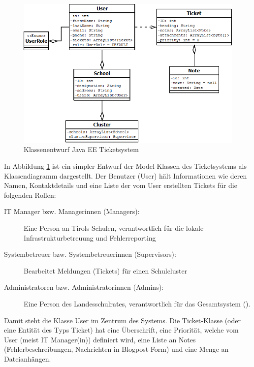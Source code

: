 \begin{figure}[h]
	\centering
	\includegraphics[scale=0.6]{figures/klassenentwurf_java_ticketsys_export.png}
	\caption{Klassenentwurf Java EE Ticketsystem}
	\label{Abb_Klassendesign_TicketSys}
\end{figure}

In Abbildung \ref{Abb_Klassendesign_TicketSys} ist ein simpler Entwurf der Model-Klassen des Ticketsystems als Klassendiagramm dargestellt. Der Benutzer (User) hält Informationen wie deren Namen, Kontaktdetails und eine Liste der vom User erstellten Tickets für die folgenden Rollen:

\begin{description}
	\item[IT Manager bzw. Managerinnen (Managers):] Eine Person an Tirols Schulen, verantwortlich für die lokale Infrastrukturbetreuung und Fehlerreporting
	\item[Systembetreuer bzw. Systembetreuerinnen (Supervisors):] Bearbeitet Meldungen (Tickets) für einen Schulcluster
	\item[Administratoren bzw. Administratorinnen (Admins):] Eine Person des Landesschulrates, verantwortlich für das Gesamtsystem (\getHammerl).
\end{description}

Damit steht die Klasse User im Zentrum des Systems. Die Ticket-Klasse (oder eine Entität des Typs Ticket) hat eine Überschrift, eine Priorität, welche vom User (meist IT Manager(in)) definiert wird, eine Liste an Notes (Fehlerbeschreibungen, Nachrichten in Blogpost-Form) und eine Menge an Dateianhängen.
